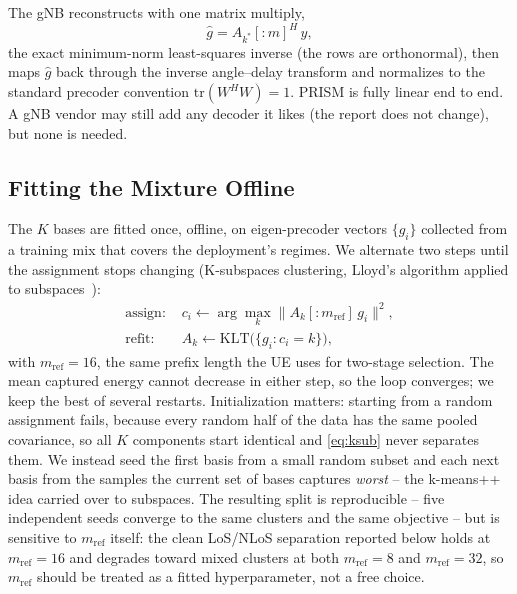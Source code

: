 \documentclass[conference]{IEEEtran}
\begin{document}
The gNB reconstructs with one matrix multiply,
\begin{equation}
\hat g = A_{k^*}[{:}m]^{H}\, y ,
\label{eq:ls}
\end{equation}
the exact minimum-norm least-squares inverse (the rows are orthonormal), then maps $\hat g$ back through the inverse angle--delay transform and normalizes to the standard precoder convention $\mathrm{tr}(W^HW)=1$. PRISM is fully linear end to end. A gNB vendor may still add any decoder it likes (the report does not change), but none is needed.

\subsection{Fitting the Mixture Offline}
The $K$ bases are fitted once, offline, on eigen-precoder vectors $\{g_i\}$ collected from a training mix that covers the deployment's regimes. We alternate two steps until the assignment stops changing (K-subspaces clustering, Lloyd's algorithm applied to subspaces~\cite{tipping1999mppca,vidal2011subspace}):
\begin{equation}
\begin{aligned}
\text{assign: } & c_i \leftarrow \arg\max_k \lVert A_k[{:}m_{\mathrm{ref}}]\, g_i \rVert^2,\\
\text{refit: } & A_k \leftarrow \mathrm{KLT}\bigl(\{g_i : c_i = k\}\bigr),
\end{aligned}
\label{eq:ksub}
\end{equation}
with $m_{\mathrm{ref}}{=}16$, the same prefix length the UE uses for two-stage selection. The mean captured energy cannot decrease in either step, so the loop converges; we keep the best of several restarts. Initialization matters: starting from a random assignment fails, because every random half of the data has the same pooled covariance, so all $K$ components start identical and \eqref{eq:ksub} never separates them. We instead seed the first basis from a small random subset and each next basis from the samples the current set of bases captures \emph{worst} -- the k-means++ idea carried over to subspaces. The resulting split is reproducible -- five independent seeds converge to the same clusters and the same objective -- but is sensitive to $m_{\mathrm{ref}}$ itself: the clean LoS/NLoS separation reported below holds at $m_{\mathrm{ref}}{=}16$ and degrades toward mixed clusters at both $m_{\mathrm{ref}}{=}8$ and $m_{\mathrm{ref}}{=}32$, so $m_{\mathrm{ref}}$ should be treated as a fitted hyperparameter, not a free choice.
\end{document}

